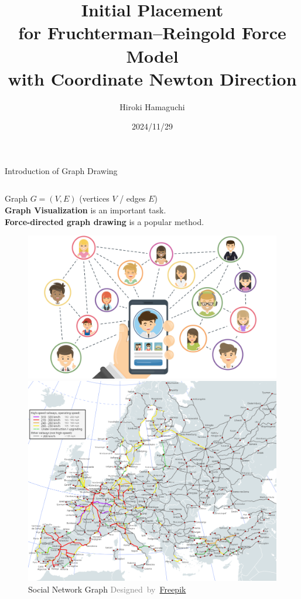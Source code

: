 \documentclass[dvipdfmx,13pt,aspectratio=169]{beamer}
\title{\huge{Initial Placement\\for Fruchterman--Reingold Force Model\\with Coordinate Newton Direction}}
\author{\Large{Hiroki Hamaguchi}}
\institute{\large{5th lab}\\\large{Supervisor: Prof. Akiko Takeda}}
\date{2024/11/29}
\newcommand{\gray}[1]{\textcolor{gray}{#1}}
\newif\ifShowHidden
\begin{document}
\ifShowHidden
  \maketitle
\fi

\begin{frame}{Introduction of Graph Drawing}
  \begin{columns}
    \begin{column}{0.58\columnwidth}
      \large{%
        Graph $G = (V,E)$ (vertices $V$  / edges $E$)\\
        \textbf{Graph Visualization} \normalsize{is an important task.}\\
        \textbf{Force-directed graph drawing} \normalsize{is a popular method.}
      }
      \begin{figure}[htbp]
        \centering
        \begin{minipage}{0.55\columnwidth}
          \centering
          \includegraphics[width=\columnwidth]{introExample/social.jpg}
          \caption*{
            Social Network Graph
            \gray{\footnotesize{Designed~by~\href{www.freepik.com}{Freepik}}}
          }
        \end{minipage}%
        \begin{minipage}{0.45\columnwidth}
          \centering
          \includegraphics[width=\columnwidth]{introExample/railway.png}

\end{minipage}
\end{figure}
\end{column}
\end{columns}
\end{frame}
\end{document}
